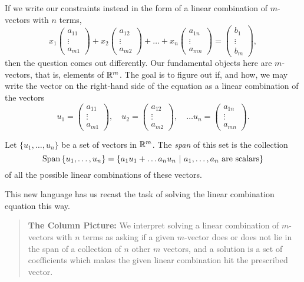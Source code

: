 \documentclass[00-livre-main.tex]{subfiles}
\begin{document}
If we write our constraints instead in the form of a linear combination of $m$-vectors with $n$ terms, 
\[
x_1 \begin{pmatrix} a_{11}\\ \vdots \\ a_{m1} \end{pmatrix} + 
x_2 \begin{pmatrix} a_{12}\\ \vdots \\ a_{m2} \end{pmatrix} +
\dots +
x_n \begin{pmatrix} a_{1n}\\ \vdots \\ a_{mn} \end{pmatrix} = 
\begin{pmatrix} b_1\\ \vdots \\ b_m \end{pmatrix},
\]
then the question comes out differently. Our fundamental objects here are $m$-vectors, that is, elements of $\mathbb{R}^m$. The goal is to figure out if, and how, we may write the vector
on the right-hand side of the equation as a linear combination of the vectors
\[
u_1 = \begin{pmatrix} a_{11}\\ \vdots \\ a_{m1} \end{pmatrix}, \quad
u_2 = \begin{pmatrix} a_{12}\\ \vdots \\ a_{m2} \end{pmatrix}, \quad
\dots 
u_n = \begin{pmatrix} a_{1n}\\ \vdots \\ a_{mn} \end{pmatrix}.
\]

\begin{definition}
Let $\{u_1, \ldots, u_n\}$ be a set of vectors in $\mathbb{R}^m$. The \emph{span} of this set is the collection
\[
\mathrm{Span}\left\{ u_1, \ldots, u_n \right\} = \left\{ a_1 u_1 + \dots a_n u_n \ \middle| \ \text{$a_1, \ldots, a_n$ are scalars}\right\}
\]
of all the possible linear combinations of these vectors.
\end{definition}

This new language has us recast the task of solving the linear combination equation this way. 

\begin{quote}
\textbf{The Column Picture:} We interpret solving a linear combination of $m$-vectors with $n$ terms as asking if a given $m$-vector does or does not lie in the span of a collection of $n$ other $m$ vectors, and a solution is a set of coefficients which makes the given linear combination hit the prescribed vector.
\end{quote}
\end{document}
